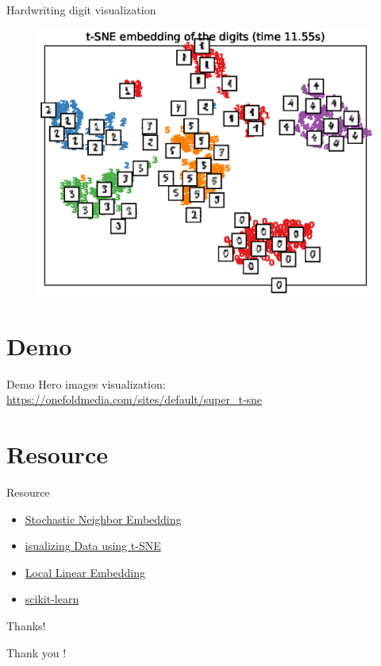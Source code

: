 \documentclass[10pt]{beamer}
\begin{document}
\begin{frame}{Hardwriting digit visualization}
\begin{figure}
\centering
\includegraphics[scale=0.65]{./image/experiment/tsne.eps}
\end{figure}
\end{frame}


\section{Demo}
\begin{frame}{Demo}
Hero images visualization: \url{https://onefoldmedia.com/sites/default/super_t-sne}
\end{frame}

\section{Resource}
\begin{frame}{Resource}
\begin{itemize}
	\item \href{http://www.cs.toronto.edu/~hinton/absps/sne.pdf}{Stochastic Neighbor Embedding}
	\item \href{http://www.cs.toronto.edu/~hinton/absps/tsnefinal.pdf}{isualizing Data using t-SNE}
	\item \href{http://www.cs.toronto.edu/~hinton/csc2535/readings/lle.pdf}{Local Linear Embedding}
	\item \href{http://scikit-learn.org/stable/index.html}{scikit-learn}
\end{itemize}
\end{frame}

\begin{frame}{Thanks!}
\begin{center}
	\LARGE Thank you !
\end{center}
\end{frame}
\end{document}
